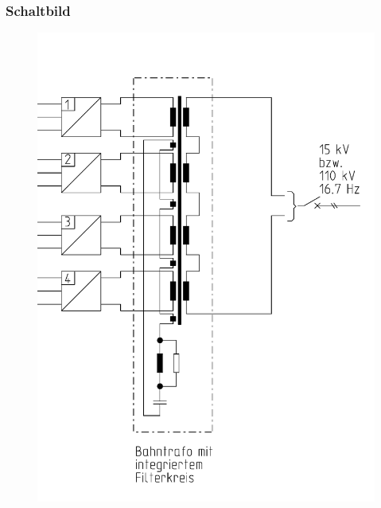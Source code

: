 \subsubsection*{Schaltbild}
\begin{figure}[htb]
\centering
\includegraphics[width=\textwidth/3,frame]{Bilder/stromrichtertrafo.png}
\end{figure}


